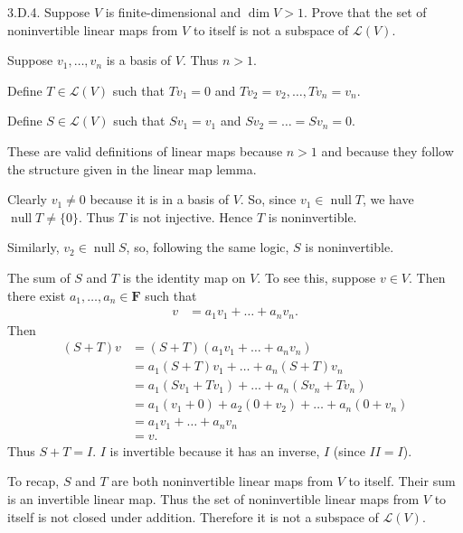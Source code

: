 \documentclass[a5paper]{article}
\begin{document}
\newcommand   \C           {\mathbf{C}}
\newcommand   \R           {\mathbf{R}}
\renewcommand \L           {\mathcal{L}}
\newcommand   \F           {\mathbf{F}}
\renewcommand \P           {\mathcal{P}}
\newcommand   \M           {\mathcal{M}}
\newcommand   \op          {\operatorname}

    3.D.4.
    Suppose $V$ is finite-dimensional and $\op{dim}V > 1$.
    Prove that the set of noninvertible linear maps from $V$ to itself is not a subspace of $\L(V)$.

    Suppose $v_1,\dots,v_n$ is a basis of $V$.
    Thus $n > 1$.

    Define $T \in \L(V)$ such that $Tv_1 = 0$ and $Tv_2 = v_2, \dots, Tv_n = v_n$.

    Define $S \in \L(V)$ such that $Sv_1 = v_1$ and $Sv_2 = \dots = Sv_n = 0$.

    These are valid definitions of linear maps because $n > 1$ and because they follow the structure given in the linear map lemma.

    Clearly $v_1 \neq 0$ because it is in a basis of $V$.
    So, since $v_1 \in \op{null}T$, we have $\op{null}T \neq \{0\}$.
    Thus $T$ is not injective.
    Hence $T$ is noninvertible.

    Similarly, $v_2 \in \op{null}S$, so, following the same logic, $S$ is noninvertible.

    The sum of $S$ and $T$ is the identity map on $V$.
    To see this, suppose $v \in V$.
    Then there exist $a_1,\dots,a_n \in \F$ such that
\begin{align*}
        v &= a_1 v_1 + \dots + a_n v_n .
\end{align*}
    Then
\begin{align*}
        (S + T) v   &= (S + T)( a_1 v_1 + \dots + a_n v_n ) \\
                    &= a_1(S + T)v_1 + \dots + a_n(S + T)v_n \\
                    &= a_1(Sv_1 + Tv_1) + \dots + a_n(Sv_n + Tv_n) \\
                    &= a_1(v_1 + 0) + a_2(0 + v_2) + \dots + a_n(0 + v_n) \\
                    &= a_1v_1 + \dots + a_nv_n \\
                    &= v .
\end{align*}
    Thus $S + T = I$.
    $I$ is invertible because it has an inverse, $I$ (since $II = I$).

    To recap, $S$ and $T$ are both noninvertible linear maps from $V$ to itself.
    Their sum is an invertible linear map.
    Thus the set of noninvertible linear maps from $V$ to itself is not closed under addition.
    Therefore it is not a subspace of $\L(V)$.
\end{document}
